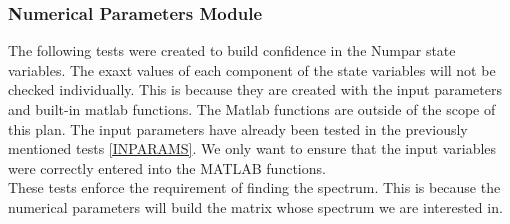 \documentclass[12pt, titlepage]{article}
\begin{document}
\subsubsection{Numerical Parameters Module}

The following tests were created to build confidence in the Numpar state 
variables. The exaxt values of each component of the state variables will not 
be checked individually. This is because they are created with the input 
parameters and built-in matlab functions. The Matlab 
functions are outside of the scope 
of this plan. The input parameters have already been tested in the previously 
mentioned tests \ref{INPARAMS}. We only want to ensure that the input variables 
were correctly entered into the MATLAB functions. \\
These tests enforce the requirement of finding the spectrum. This is because 
the numerical 
parameters will build the matrix whose spectrum we are interested in. \\ 
\end{document}
